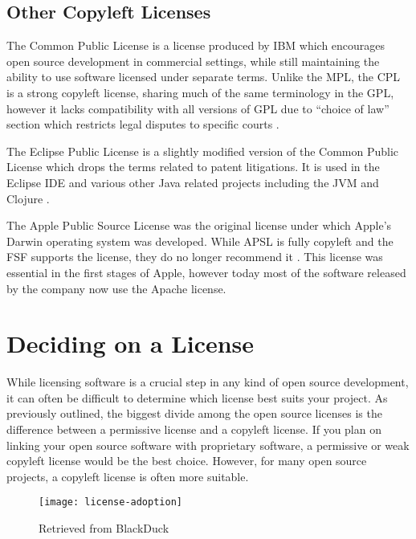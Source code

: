 \documentclass[12pt,letterpaper]{article}
\begin{document}
\subsection{Other Copyleft Licenses}

The Common Public License is a license produced by IBM which encourages open source development in commercial settings, while still maintaining the ability to use software licensed under separate terms. Unlike the MPL, the CPL is a strong copyleft license, sharing much of the same terminology in the GPL, however it lacks compatibility with all versions of GPL due to ``choice of law'' section which restricts legal disputes to specific courts \cite{cpl}.

The Eclipse Public License is a slightly modified version of the Common Public License which drops the terms related to patent litigations. It is used in the Eclipse IDE and various other Java related projects including the JVM and Clojure \cite{epl}.

The Apple Public Source License was the original license under which Apple's Darwin operating system was developed. While APSL is fully copyleft and the FSF supports the license, they do no longer recommend it \cite{licenselist}. This license was essential in the first stages of Apple, however today most of the software released by the company now use the Apache license.

\section{Deciding on a License}

While licensing software is a crucial step in any kind of open source development, it can often be difficult to determine which license best suits your project. As previously outlined, the biggest divide among the open source licenses is the difference between a permissive license and a copyleft license. If you plan on linking your open source software with proprietary software, a permissive or weak copyleft license would be the best choice. However, for many  open source projects, a copyleft license is often more suitable.

\begin{figure}[h]
\begin{adjustwidth}{-1in}{-1in}
  \centering
  \texttt{[image: license-adoption]}
\end{adjustwidth}
  \caption[Top 20 Open Source Licenses]{Retrieved from BlackDuck \cite{license-stats}}
\end{figure}
\end{document}
